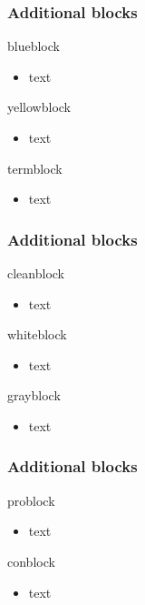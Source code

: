 \documentclass[t,compress,aspectratio=43,12p]{beamer} %
\begin{document}
\begin{frame}
\frametitle{Additional blocks}
\begin{blueblock}{blueblock}
\begin{itemize} \item text \end{itemize}
\end{blueblock}
\begin{yellowblock}{yellowblock}
\begin{itemize} \item text \end{itemize}
\end{yellowblock}
\begin{termblock}{termblock}
\begin{itemize} \item text \end{itemize}
\end{termblock}
\end{frame}

\begin{frame}
\frametitle{Additional blocks}
\begin{cleanblock}{cleanblock}
\begin{itemize} \item text \end{itemize}
\end{cleanblock}
\begin{whiteblock}{whiteblock}
\begin{itemize} \item text \end{itemize}
\end{whiteblock}
\begin{grayblock}{grayblock}
\begin{itemize} \item text \end{itemize}
\end{grayblock}
\end{frame}

\begin{frame}
\frametitle{Additional blocks}
\begin{problock}{problock}
\begin{itemize} \item text \end{itemize}
\end{problock}
\begin{conblock}{conblock}
\begin{itemize} \item text \end{itemize}
\end{conblock}
\end{frame}
\end{document}
